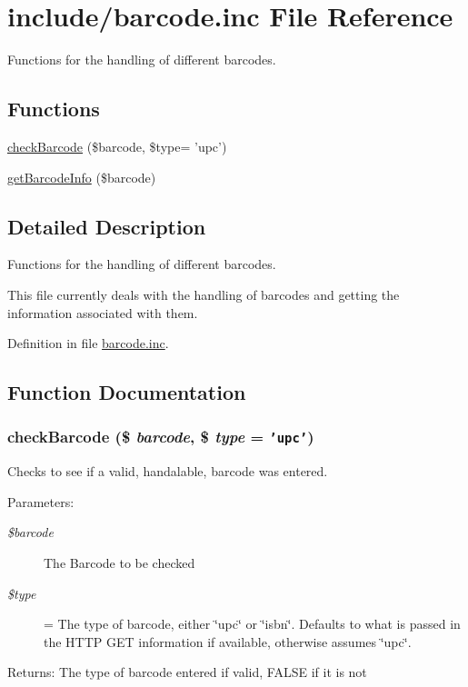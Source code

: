 \hypertarget{barcode_8inc}{
\section{include/barcode.inc File Reference}
\label{barcode_8inc}
}
Functions for the handling of different barcodes. 

\subsection*{Functions}
\begin{CompactItemize}
\item 
\hyperlink{barcode_8inc_b34ec866d27061573a5fa623bf314fc1}{checkBarcode} (\$barcode, \$type= 'upc')
\item 
\hyperlink{barcode_8inc_e10c37e4f9f9b7c6617a388351a27c99}{getBarcodeInfo} (\$barcode)
\end{CompactItemize}


\subsection{Detailed Description}
Functions for the handling of different barcodes. 

This file currently deals with the handling of barcodes and getting the information associated with them. 

Definition in file \hyperlink{barcode_8inc-source}{barcode.inc}.

\subsection{Function Documentation}
\hypertarget{barcode_8inc_b34ec866d27061573a5fa623bf314fc1}{
\subsubsection{\setlength{\rightskip}{0pt plus 5cm}checkBarcode (\$ {\em barcode}, \$ {\em type} = {\tt 'upc'})}}
\label{barcode_8inc_b34ec866d27061573a5fa623bf314fc1}


Checks to see if a valid, handalable, barcode was entered. \begin{Desc}
\item[Parameters:]
\begin{description}
\item[{\em \$barcode}]The Barcode to be checked \item[{\em \$type}]= The type of barcode, either \char`\"{}upc\char`\"{} or \char`\"{}isbn\char`\"{}. Defaults to what is passed in the HTTP GET information if available, otherwise assumes \char`\"{}upc\char`\"{}. \end{description}
\end{Desc}
\begin{Desc}
\item[Returns:]The type of barcode entered if valid, FALSE if it is not \end{Desc}



